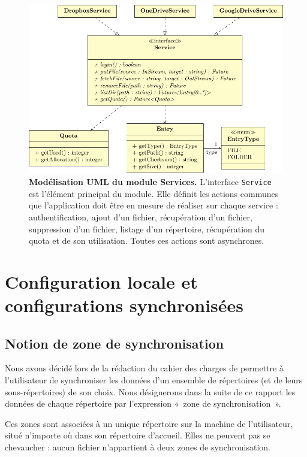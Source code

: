 \begin{figure}[h!]
    \centering
    \includegraphics{figures/services}
    \caption{\textbf{Modélisation UML du module Services.} L'interface \texttt{Service} est l'élément principal du module. Elle définit les actions communes que l'application doit être en mesure de réaliser sur chaque service : authentification, ajout d'un fichier, récupération d'un fichier, suppression d'un fichier, listage d'un répertoire, récupération du quota et de son utilisation. Toutes ces actions sont asynchrones.}
    \label{fig:conception-services}
\end{figure}

\section{Configuration locale et configurations synchronisées}

\subsection{Notion de zone de synchronisation}

Nous avons décidé lors de la rédaction du cahier des charges de permettre à l'utilisateur de synchroniser les données d'un ensemble de répertoires (et de leurs sous-répertoires) de son choix. Nous désignerons dans la suite de ce rapport les données de chaque répertoire par l'expression «~zone de synchronisation~».

Ces zones sont associées à un unique répertoire sur la machine de l'utilisateur, situé n'importe où dans son répertoire d'accueil. Elles ne peuvent pas se chevaucher : aucun fichier n'appartient à deux zones de synchronisation.

